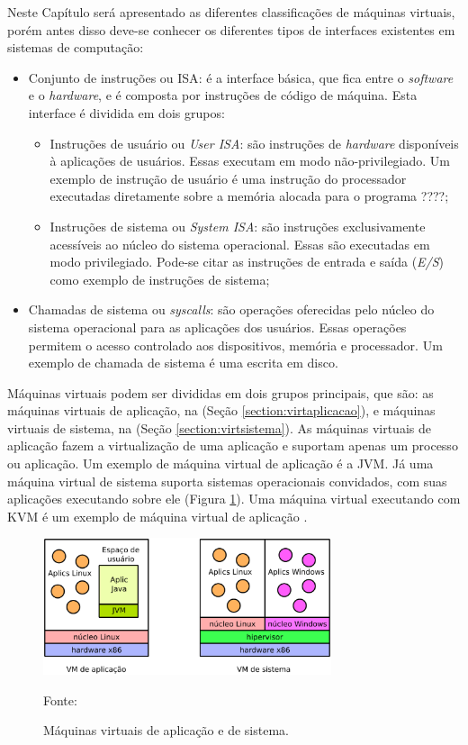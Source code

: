 Neste Capítulo será apresentado as diferentes classificações de máquinas virtuais, porém antes disso deve-se conhecer os diferentes 
tipos de interfaces existentes em sistemas de computação:
\begin{itemize}
 \item Conjunto de instruções ou \ac{ISA}: é a interface básica, que fica entre o \textit{software} e o \textit{hardware}, e é composta por 
 instruções de código de máquina. Esta interface é dividida em dois grupos:
 \begin{itemize}
  \item Instruções de usuário ou \textit{User \ac{ISA}}: são instruções de \textit{hardware} disponíveis à aplicações de usuários. Essas 
  executam em modo não-privilegiado. Um exemplo de instrução de usuário é uma instrução do processador executadas diretamente sobre a memória
  alocada para o programa ????;
  \item Instruções de sistema ou \textit{System \ac{ISA}}: são instruções exclusivamente acessíveis ao núcleo do sistema operacional. 
  Essas são executadas em modo privilegiado. Pode-se citar as instruções de entrada e saída (\textit{E/S}) como exemplo de instruções de sistema;
 \end{itemize}
 \item Chamadas de sistema ou \textit{syscalls}: são operações oferecidas pelo núcleo do sistema operacional para as aplicações dos usuários.
 Essas operações permitem o acesso controlado aos dispositivos, memória e processador. Um exemplo de chamada de sistema é uma escrita em disco.
\end{itemize}

Máquinas virtuais podem ser divididas em dois grupos principais, que são: as máquinas virtuais de aplicação, na (Seção \ref{section:virtaplicacao}), 
e máquinas virtuais de sistema, na (Seção \ref{section:virtsistema}). As máquinas virtuais de aplicação fazem a virtualização de uma 
aplicação e suportam apenas um processo ou aplicação. Um exemplo de máquina virtual de aplicação é a \ac{JVM}. Já uma máquina virtual de 
sistema suporta sistemas operacionais convidados, com suas aplicações executando sobre ele (Figura \ref{fig:vms_tipos}). Uma máquina virtual 
executando com \ac{KVM} é um exemplo de máquina virtual de aplicação \cite{laureano2008}.

\begin{figure}[vms_tipos]
 \centering
 \includegraphics[width=320px]{img/vms_tipos.eps}
 \caption{Máquinas virtuais de aplicação e de sistema.}
 \label{fig:vms_tipos}
 Fonte: \citet{laureano2008}
\end{figure}

